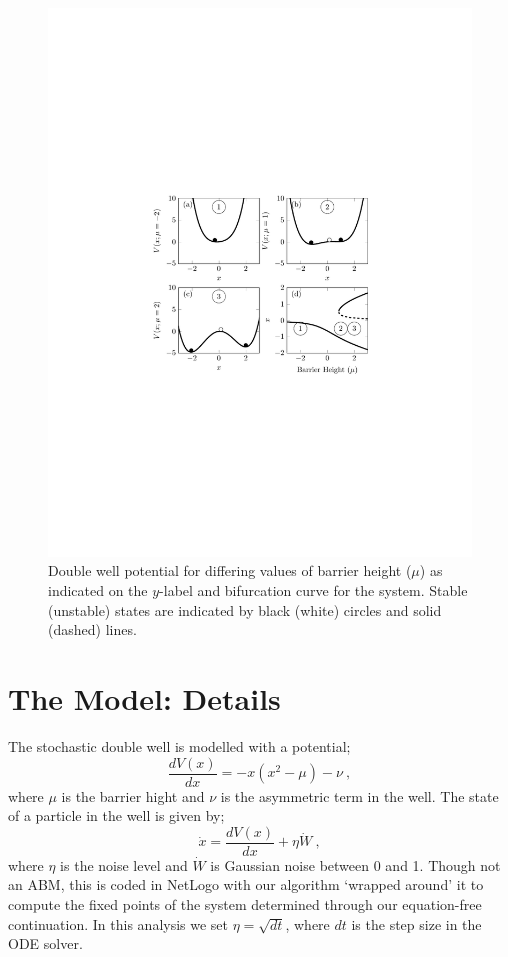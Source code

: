 \documentclass[11pt]{article}
\begin{document}
\begin{figure}[t]
	\centering
	\includegraphics[width=0.75\linewidth, trim=5cm 9cm 5cm 9cm, clip=true]{DoubleWell}
	\caption{Double well potential for differing values of barrier height ($\mu$) as indicated on the $y$-label and bifurcation curve for the system. Stable (unstable) states are indicated by black (white) circles and solid (dashed) lines. \label{fig:DDW}}
\end{figure}

\section{The Model: Details} 
\label{sec:details}
The stochastic double well is modelled with a potential;
\begin{equation}
	\frac{dV(x)}{dx} = -x(x^2 - \mu) - \nu~,
\end{equation}
	where $\mu$ is the barrier hight and $\nu$ is the asymmetric term in the well. The state of a particle in the well is given by;
\begin{equation}
	\dot{x} = \frac{dV(x)}{dx} + \eta\dot{W}~,
\end{equation}
	where $\eta$ is the noise level and $\dot{W}$ is Gaussian noise between 0 and 1. Though not an ABM, this is coded in NetLogo with our algorithm `wrapped around' it to compute the fixed points of the system determined through our equation-free continuation. In this analysis we set $\eta=\sqrt{dt}$, where $dt$ is the step size in the ODE solver.
\end{document}
